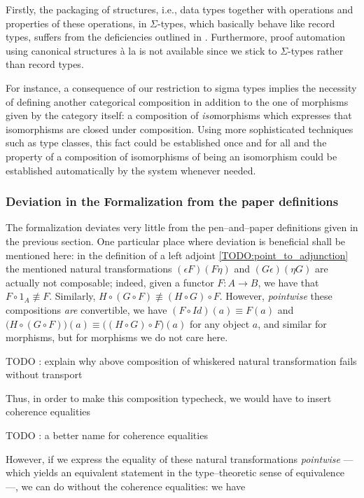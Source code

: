 Firstly, the packaging of structures, i.e., data types together with operations and properties of these operations,
in $\Sigma$-types, which basically behave like record types,
suffers from the deficiencies outlined in \cite{DBLP:journals/mscs/SpittersW11}. Furthermore,
proof automation using canonical structures \`a la \cite{DBLP:conf/icfp/GonthierZND11} is not
available since we stick to $\Sigma$-types rather than record types.

For instance, a consequence of our restriction to sigma types implies the necessity of defining another
categorical composition in addition to the one of morphisms given by the category itself: a composition of
\emph{iso}morphisms which expresses that isomorphisms are closed under composition.
Using more sophisticated techniques such as type classes, this fact could be established once and for all and the property of
a composition of isomorphisms of being an isomorphism could be established automatically by the system whenever needed.


\subsubsection*{Deviation in the Formalization from the paper definitions}

The formalization deviates very little from the pen--and--paper definitions given in the previous section.
One particular place where deviation is beneficial shall be mentioned here:
in the definition of a left adjoint \ref{TODO:point_to_adjunction}
the mentioned natural transformations $(\epsilon F)(F\eta)$ and $(G\epsilon)(\eta G)$ are actually not
composable; indeed, given a functor $F : A \to B$, we have that $F \circ 1_A \not\equiv F$.
Similarly, $H \circ (G \circ F)\not \equiv (H\circ G)\circ F$. However, \emph{pointwise} these compositions
\emph{are} convertible, we have $(F \circ Id) (a) \equiv F(a)$ and
$\big(H \circ (G \circ F)\big)(a)\equiv \big((H\circ G)\circ F\big)(a)$ for any object $a$, and similar for morphisms, but for morphisms
we do not care here.

TODO : explain why above composition of whiskered natural transformation fails without transport

Thus, in order to make this composition typecheck, we would have to insert coherence equalities

TODO : a better name for coherence equalities

However, if we express the equality of these natural transformations \emph{pointwise} --- which yields an equivalent statement
in the type--theoretic sense of equivalence ---, we can do without the coherence equalities: we have

